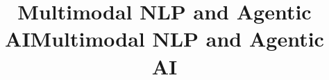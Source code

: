 \documentclass[10pt, aspectratio=169]{beamer}
\title[Multimodal NLP and Agentic AI]{Multimodal NLP and Agentic AI}
\begin{document}
\title[Multimodal NLP and Agentic AI]{Multimodal NLP and Agentic AI}













\end{document}
